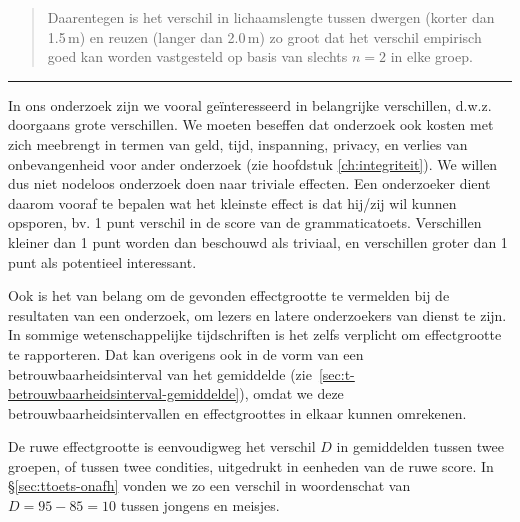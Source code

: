 \documentclass[
]{book}
\begin{document}
\begin{quote}
Daarentegen is het verschil in lichaamslengte tussen dwergen (korter dan
1.5 m) en reuzen (langer dan 2.0 m) zo groot dat het verschil empirisch goed kan worden
vastgesteld op basis van slechts \(n=2\) in elke groep.
\end{quote}

\begin{center}\rule{0.5\linewidth}{0.5pt}\end{center}

In ons onderzoek zijn we vooral geïnteresseerd in belangrijke
verschillen, d.w.z. doorgaans grote verschillen. We moeten beseffen dat
onderzoek ook kosten met zich meebrengt in termen van geld, tijd,
inspanning, privacy, en verlies van onbevangenheid voor ander onderzoek
(zie hoofdstuk
\ref{ch:integriteit}). We willen dus niet nodeloos onderzoek doen
naar triviale effecten. Een onderzoeker dient daarom vooraf te bepalen
wat het kleinste effect is dat hij/zij wil kunnen opsporen, bv. 1 punt
verschil in de score van de grammaticatoets. Verschillen kleiner dan 1
punt worden dan beschouwd als triviaal, en verschillen groter dan 1 punt
als potentieel interessant.

Ook is het van belang om de gevonden effectgrootte te vermelden bij de
resultaten van een onderzoek, om lezers en latere onderzoekers van
dienst te zijn. In sommige wetenschappelijke tijdschriften is het zelfs
verplicht om effectgrootte te rapporteren. Dat kan overigens ook in de
vorm van een betrouwbaarheidsinterval van het gemiddelde
(zie~\ref{sec:t-betrouwbaarheidsinterval-gemiddelde}), omdat we deze
betrouwbaarheidsintervallen en effectgroottes in elkaar kunnen
omrekenen.

De ruwe effectgrootte is eenvoudigweg het verschil \(D\) in gemiddelden
tussen twee groepen, of tussen twee condities, uitgedrukt in eenheden
van de ruwe score. In §\ref{sec:ttoets-onafh} vonden we zo een verschil in woordenschat
van \(D=95-85=10\) tussen jongens en meisjes.
\end{document}
